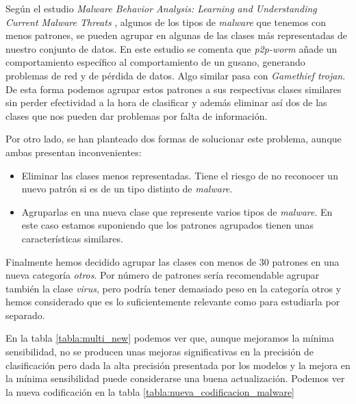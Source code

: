 Según el estudio \textit{Malware Behavior Analysis: Learning and Understanding Current Malware Threats} \cite{mba}, algunos de los tipos de \textit{malware} que tenemos con menos patrones, se pueden agrupar en algunas de las clases más representadas de nuestro conjunto de datos. En este estudio se comenta que \textit{p2p-worm} añade un comportamiento específico al comportamiento de un gusano, generando problemas de red y de pérdida de datos. Algo similar pasa con \textit{Gamethief trojan}. De esta forma podemos agrupar estos patrones a sus respectivas clases similares sin perder efectividad a la hora de clasificar y además eliminar así dos de las clases que nos pueden dar problemas por falta de información.

\vspace{1em}

Por otro lado, se han planteado dos formas de solucionar este problema, aunque ambas presentan inconvenientes:

\begin{itemize}
	\item Eliminar las clases menos representadas. Tiene el riesgo de no reconocer un nuevo patrón si es de un tipo distinto de \textit{malware}.
	\item Agruparlas en una nueva clase que represente varios tipos de \textit{malware}. En este caso estamos suponiendo que los patrones agrupados tienen unas características similares.
\end{itemize}

\vspace{1em}

Finalmente hemos decidido agrupar las clases con menos de 30 patrones en una nueva categoría \textit{otros}. Por número de patrones sería recomendable agrupar también la clase \textit{virus}, pero podría tener demasiado peso en la categoría otros y hemos considerado que es lo suficientemente relevante como para estudiarla por separado.

\vspace{1em}

En la tabla \ref{tabla:multi_new} podemos ver que, aunque mejoramos la mínima sensibilidad, no se producen unas mejoras significativas en la precisión de clasificación pero dada la alta precisión presentada por los modelos y la mejora en la mínima sensibilidad puede considerarse una buena actualización. Podemos ver la nueva codificación en la tabla \ref{tabla:nueva_codificacion_malware}

